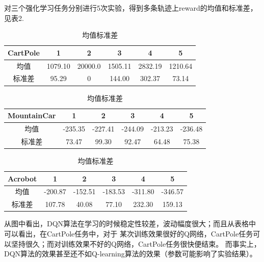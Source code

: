 \documentclass[a4paper,UTF8]{article}
\theoremstyle{definition}
\begin{document}
对三个强化学习任务分别进行5次实验，得到多条轨迹上reward的均值和标准差，见表2.

\begin{table}[!htbp]
	\centering
	\caption{均值标准差}
	\begin{tabular}{|c|c|c|c|c|c|}
	
		\hline
		
		\hline
		
		CartPole & 1 & 2 & 3 & 4 & 5 \\
		
		\hline
		
		均值 & 1079.10 & 20000.0 & 1505.11 & 2832.19 & 1210.64\\

		\hline

		标准差 & 95.29 & 0 & 144.00 & 302.37 & 73.14\\
		
		\hline
	
	\end{tabular}
	
	\begin{tabular}{|c|c|c|c|c|c|}
	
		\hline
		
		\hline
		
		MountainCar & 1 & 2 & 3 & 4 & 5 \\
		
		\hline
		
		均值 & -235.35 & -227.41 & -244.09 & -213.23 & -236.48\\

		\hline

		标准差 & 73.47 & 99.30 & 92.47 & 64.48 & 75.38\\
		
		\hline
	
	\end{tabular}
	
	\begin{tabular}{|c|c|c|c|c|c|}
	
		\hline
		
		\hline
		
		Acrobot & 1 & 2 & 3 & 4 & 5 \\
		
		\hline
		
		均值 & -200.87 & -152.51 & -183.53 & -311.80 & -346.57\\

		\hline

		标准差 & 107.78 & 40.08 & 77.10 & 232.30 & 159.13\\
		
		\hline
	
	\end{tabular}
\end{table}
	从图中看出，DQN算法在学习的时候稳定性较差，波动幅度很大；而且从表格中可以看出，在CartPole任务中，对于
	某次训练效果很好的Q网络，CartPole任务可以坚持很久；而对训练效果不好的Q网络，CartPole任务很快便结束。
	而事实上，DQN算法的效果甚至还不如Q-learning算法的效果（参数可能影响了实验结果）。
\end{document}
